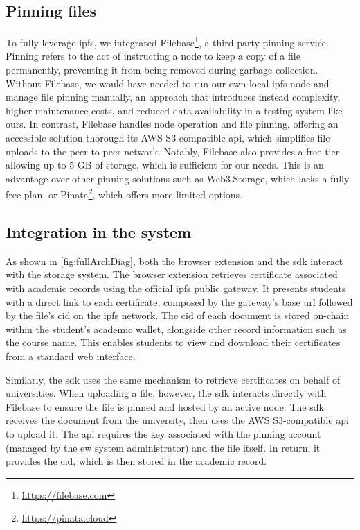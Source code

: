 \subsection{Pinning files}
To fully leverage \acrshort{ipfs}, we integrated Filebase\footnote{\url{https://filebase.com}}, a third-party pinning service. Pinning refers to the act of instructing a node to keep a copy of a file permanently, preventing it from being removed during garbage collection. Without Filebase, we would have needed to run our own local \acrshort{ipfs} node and manage file pinning manually, an approach that introduces instead complexity, higher maintenance costs, and reduced data availability in a testing system like ours. In contrast, Filebase handles node operation and file pinning, offering an accessible solution thorough its AWS S3-compatible \acrshort{api}, which simplifies file uploads to the peer-to-peer network. Notably, Filebase also provides a free tier allowing up to 5 GB of storage, which is sufficient for our needs. This is an advantage over other pinning solutions such as Web3.Storage, which lacks a fully free plan, or Pinata\footnote{\url{https://pinata.cloud}}, which offers more limited options.

\subsection{Integration in the system}
As shown in \cref{fig:fullArchDiag}, both the browser extension and the \acrshort{sdk} interact with the storage system. The browser extension retrieves certificate associated with academic records using the official \acrshort{ipfs} public gateway. It presents students with a direct link to each certificate, composed by the gateway's base \acrshort{url} followed by the file's \acrfull{cid} on the \acrshort{ipfs} network. The \acrshort{cid} of each document is stored on-chain within the student's academic wallet, alongside other record information such as the course name. This enables students to view and download their certificates from a standard web interface.

Similarly, the \acrshort{sdk} uses the same mechanism to retrieve certificates on behalf of universities. When uploading a file, however, the \acrshort{sdk} interacts directly with Filebase to ensure the file is pinned and hosted by an active node. The \acrshort{sdk} receives the document from the university, then uses the AWS S3-compatible \acrshort{api} to upload it. The \acrshort{api} requires the key associated with the pinning account (managed by the \acrshort{ew} system administrator) and the file itself. In return, it provides the \acrshort{cid}, which is then stored in the academic record.

